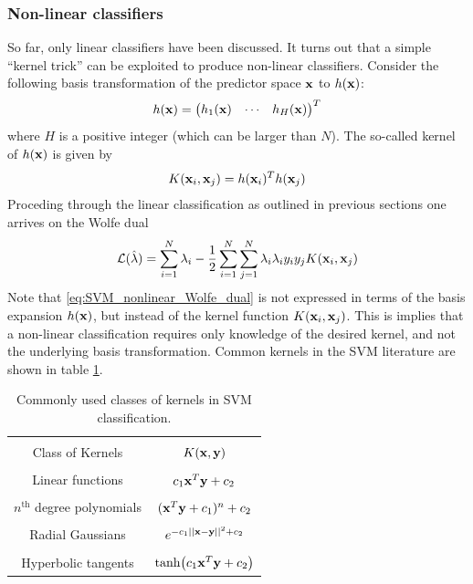 \documentclass[nofootinbib,reprint,english]{revtex4-1}
\begin{document}
\subsubsection{Non-linear classifiers}
So far, only linear classifiers have been discussed. It turns out that a simple ``kernel trick'' can be exploited to produce non-linear classifiers. Consider the following basis transformation of the predictor space \(\vb{x}\) to \(h(\vb{x})\):
\begin{equation}
h(\vb{x})=\mqty(h_1(\vb{x})&\cdots&h_H(\vb{x}))^T
\end{equation}
where \(H\) is a positive integer (which can be larger than \(N\)). The so-called kernel of \(h(\vb{x})\) is given by
\begin{equation}\label{eq:SVM_kernel}
K(\vb{x}_i,\vb{x}_j)=h(\vb{x}_i)^Th(\vb{x}_j)
\end{equation}
Proceding through the linear classification as outlined in previous sections one arrives on the Wolfe dual
\begin{equation}\label{eq:SVM_nonlinear_Wolfe_dual}
\mathcal{L}(\hat{\lambda})=\sum_{i=1}^N\lambda_i-\frac{1}{2}\sum_{i=1}^N\sum_{j=1}^N\lambda_i\lambda_iy_iy_jK(\vb{x}_i,\vb{x}_j)
\end{equation}
Note that \eqref{eq:SVM_nonlinear_Wolfe_dual} is not expressed in terms of the basis expansion \(h(\vb{x})\), but instead of the kernel function \(K(\vb{x}_i,\vb{x}_j)\). This is implies that a non-linear classification requires only knowledge of the desired kernel, and not the underlying basis transformation. Common kernels in the SVM literature are shown in table \ref{tab:SVM_kernels}.
\begin{table}
\caption{Commonly used classes of kernels in SVM classification.}\label{tab:SVM_kernels}
\begin{tabular}{|c|c|}
\hline\\[-1em]
Class of Kernels & \(K(\vb{x},\vb{y})\) \\\hline\\[-1em]
Linear functions & \(c_1\vb{x}^T\vb{y}+c_2\) \\\hline\\[-1em]
\(n^\text{th}\) degree polynomials & \((\vb{x}^T\vb{y}+c_1)^n+c_2\) \\\hline\\[-1em]
Radial Gaussians & \(e^{-c_1||\vb{x}-\vb{y}||^2+c_2}\) \\\hline\\[-1em]
Hyperbolic tangents & \(\tanh(c_1\vb{x}^T\vb{y}+c_2)\) \\\hline
\end{tabular}
\end{table}
\end{document}
